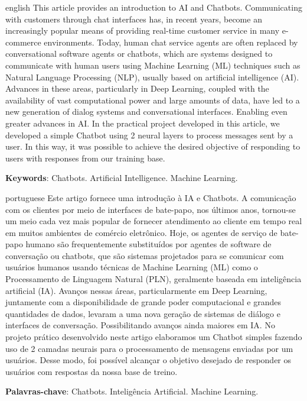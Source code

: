 \documentclass[
	12pt,				%
	openany,
	a4paper,			%
	english,			%
	french,				%
	spanish,			%
	brazil				%
	]{abntex2}
\begin{document}
\begin{resumo}[Abstract]
	\begin{otherlanguage*}{english}
		This article provides an introduction to AI and Chatbots. Communicating with customers through chat interfaces has, in recent years, become an increasingly popular means of providing real-time customer service in many e-commerce environments. Today, human chat service agents are often replaced by conversational software agents or chatbots, which are systems designed to communicate with human users using Machine Learning (ML) techniques such as Natural Language Processing (NLP), usually based on artificial intelligence (AI). Advances in these areas, particularly in Deep Learning, coupled with the availability of vast computational power and large amounts of data, have led to a new generation of dialog systems and conversational interfaces. Enabling even greater advances in AI. In the practical project developed in this article, we developed a simple Chatbot using 2 neural layers to process messages sent by a user. In this way, it was possible to achieve the desired objective of responding to users with responses from our training base.
		\vspace{\onelineskip}

		\noindent
		\textbf{Keywords}: Chatbots. Artificial Intelligence. Machine Learning.
	\end{otherlanguage*}
\end{resumo}
\setlength{\absparsep}{18pt} %
\begin{resumo}[Resumo]
	\begin{otherlanguage*}{portuguese}
		Este artigo fornece uma introdução à IA e Chatbots. A comunicação com os clientes por meio de interfaces de bate-papo, nos últimos anos, tornou-se um meio cada vez mais popular de fornecer atendimento ao cliente em tempo real em muitos ambientes de comércio eletrônico. Hoje, os agentes de serviço de bate-papo humano são frequentemente substituídos por agentes de software de conversação ou chatbots, que são sistemas projetados para se comunicar com usuários humanos usando técnicas de Machine Learning (ML) como o Processamento de Linguagem Natural (PLN), geralmente baseada em inteligência artificial (IA).
		Avanços nessas áreas, particularmente em Deep Learning, juntamente com a disponibilidade de grande poder computacional e grandes quantidades de dados, levaram a uma nova geração de sistemas de diálogo e interfaces de conversação. Possibilitando avanços ainda maiores em IA.
		No projeto prático desenvolvido neste artigo elaboramos um Chatbot simples fazendo uso de 2 camadas neurais para o processamento de mensagens enviadas por um usuários.
		Desse modo, foi possível  alcançar o objetivo desejado de responder os usuários com respostas da nossa base de treino.
		\vspace{\onelineskip}

		\noindent
		\textbf{Palavras-chave}: Chatbots. Inteligência Artificial. Machine Learning.
	\end{otherlanguage*}
\end{resumo}
\end{document}
